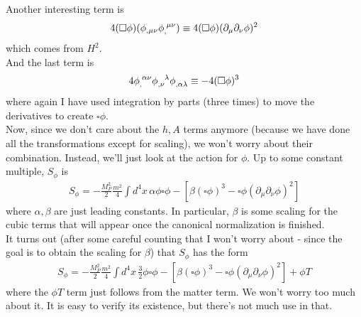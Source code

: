 \documentclass{book}
\theoremstyle{definition}
\newcommand{\p}{\partial}
\newcommand{\al}{\alpha}
\newcommand{\be}{\beta}
\newcommand{\f}[2]{\frac{#1}{#2}}
\newcommand{\lb}{\left[}
\newcommand{\rb}{\right]}
\begin{document}
\begin{framed}
	Another interesting term is
	\begin{align}
	4(\square \phi)(\phi_{,\mu\nu} \tensor{\phi}{_,^{\mu\nu}}) \equiv 4(\square \phi)(\p_\mu\p_\nu \phi)^2
	\end{align}
	which comes from $H^2$. \\
	
	And the last term is
	\begin{align}
	4\tensor{\phi}{_,^{\al\nu}}\tensor{\phi}{_{,\nu}^\lambda}\tensor{\phi}{_{,\al\lambda}} \equiv -4(\square \phi)^3
	\end{align}
	where again I have used integration by parts (three times) to move the derivatives to create $\square \phi$.\\
	
	Now, since we don't care about the $h, A$ terms anymore (because we have done all the transformations except for scaling), we won't worry about their combination. Instead, we'll just look at the action for $\phi$. Up to some constant multiple, $S_\phi$ is
	\begin{align}
	S_\phi = -\f{M_P^2}{2}\f{m^2}{4}\int d^4x\, \al\phi \square \phi - \lb \be(\square\phi)^3 - \square \phi (\p_\mu \p_\nu \phi)^2 \rb
	\end{align}
	where $\al,\be$ are just leading constants. In particular, $\beta$ is some scaling for the cubic terms that will appear once the canonical normalization is finished.\\
	
	It turns out (after some careful counting that I won't worry about - since the goal is to obtain the scaling for $\beta$) that $S_\phi$ has the form
	\begin{align}
	S_\phi = -\f{M_P^2}{2}\f{m^2}{4}\int d^4x\, \f{3}{2}\phi \square \phi - \lb \be(\square\phi)^3 - \square \phi (\p_\mu \p_\nu \phi)^2 \rb + \phi T
	\end{align}
	where the $\phi T$ term just follows from the matter term. We won't worry too much about it. It is easy to verify its existence, but there's not much use in that.\\
	

\end{framed}
\end{document}
